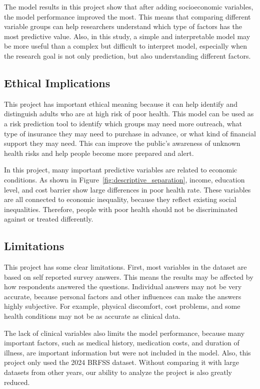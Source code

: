 The model results in this project show that after adding socioeconomic variables, the model performance improved the most. This means that comparing different variable groups can help researchers understand which type of factors has the most predictive value. Also, in this study, a simple and interpretable model may be more useful than a complex but difficult to interpret model, especially when the research goal is not only prediction, but also understanding different factors.
\subsection{Ethical Implications}
This project has important ethical meaning because it can help identify and distinguish adults who are at high risk of poor health. This model can be used as a risk prediction tool to identify which groups may need more outreach, what type of insurance they may need to purchase in advance, or what kind of financial support they may need. This can improve the public’s awareness of unknown health risks and help people become more prepared and alert.

In this project, many important predictive variables are related to economic conditions. As shown in Figure~\ref{fig:descriptive_separation}, income, education level, and cost barrier show large differences in poor health rate. These variables are all connected to economic inequality, because they reflect existing social inequalities. Therefore, people with poor health should not be discriminated against or treated differently.
\subsection{Limitations}
This project has some clear limitations. First, most variables in the dataset are based on self reported survey answers. This means the results may be affected by how respondents answered the questions. Individual answers may not be very accurate, because personal factors and other influences can make the answers highly subjective. For example, physical discomfort, cost problems, and some health conditions may not be as accurate as clinical data.

The lack of clinical variables also limits the model performance, because many important factors, such as medical history, medication costs, and duration of illness, are important information but were not included in the model. Also, this project only used the 2024 BRFSS dataset. Without comparing it with large datasets from other years, our ability to analyze the project is also greatly reduced.
